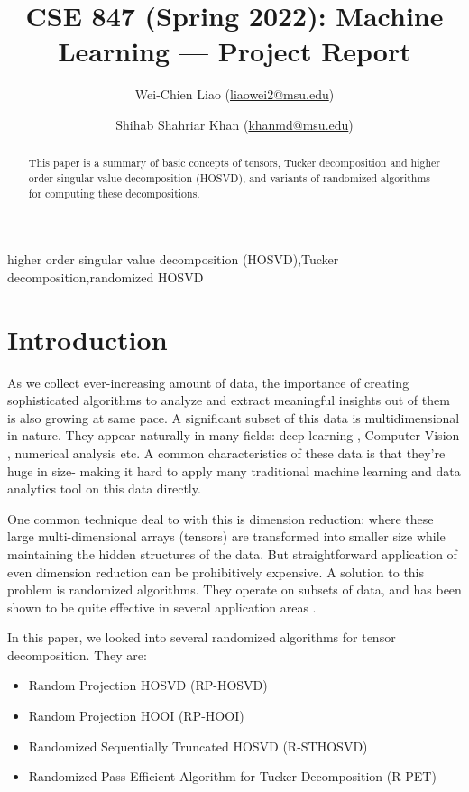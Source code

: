 \documentclass[preprint]{elsarticle}
\title{\textbf{\large{CSE 847 (Spring 2022): Machine Learning --- Project Report}}}
\author[1]{Wei-Chien Liao (\href{mailto:liaowei2@msu.edu}{liaowei2@msu.edu})}
\author[1]{Shihab Shahriar Khan (\href{mailto:khanmd@msu.edu}{khanmd@msu.edu})}
\date{}
\begin{document}
\begin{frontmatter}
\begin{abstract}
    This paper is a summary of basic concepts of tensors, Tucker decomposition and higher order singular value decomposition (HOSVD), and variants
    of randomized algorithms for computing these decompositions.
\end{abstract}
\begin{keyword}
    higher order singular value decomposition (HOSVD)\sep Tucker decomposition\sep randomized HOSVD
\end{keyword}
\end{frontmatter}
\section{Introduction}
As we collect ever-increasing amount of data, the importance of creating sophisticated algorithms to analyze and extract meaningful insights out of them is also growing at same pace. A significant subset of this data is multidimensional in nature. They appear naturally in many fields: deep learning \cite{bacciu2020tensor}, Computer Vision \cite{vasilescu2002multilinear}, numerical analysis \cite{beylkin2002numerical} etc. A common characteristics of these data is that they're huge in size- making it hard to apply many traditional machine learning and data analytics tool on this data directly.

\noindent One common technique deal to with this is dimension reduction: where these large multi-dimensional arrays (tensors) are transformed into smaller size while maintaining the hidden structures of the data. But straightforward application of even dimension reduction can be prohibitively expensive. A solution to this problem is randomized algorithms. They operate on subsets of data, and has been shown to be quite effective in several application areas \cite{savas2003analyses, vasilescu2002multilinear, beylkin2002numerical}.

\noindent In this paper, we looked into several randomized algorithms for tensor decomposition. They are:

\begin{itemize}
    \item Random Projection HOSVD (RP-HOSVD)
    \item Random Projection HOOI (RP-HOOI)
    \item Randomized Sequentially Truncated HOSVD (R-STHOSVD)
    \item Randomized Pass-Efficient Algorithm for Tucker Decomposition (R-PET)
\end{itemize}
\end{document}
